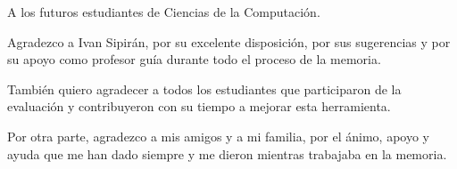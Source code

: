 \documentclass{umemoria}
\begin{document}

\begin{dedicatoria}
A los futuros estudiantes de Ciencias de la Computación.
\end{dedicatoria}

\begin{thanks}

Agradezco a Ivan Sipirán, por su excelente disposición, por sus sugerencias y por su apoyo como profesor guía durante todo el proceso de la memoria.

También quiero agradecer a todos los estudiantes que participaron de la evaluación y contribuyeron con su tiempo a mejorar esta herramienta.

Por otra parte, agradezco a mis amigos y a mi familia, por el ánimo, apoyo y ayuda que me han dado siempre y me dieron mientras trabajaba en la memoria.



\end{thanks}

\tableofcontents
\listoftables %
\listoffigures %

\mainmatter









\printbibliography[
    heading=bibintoc,
]
\end{document}

